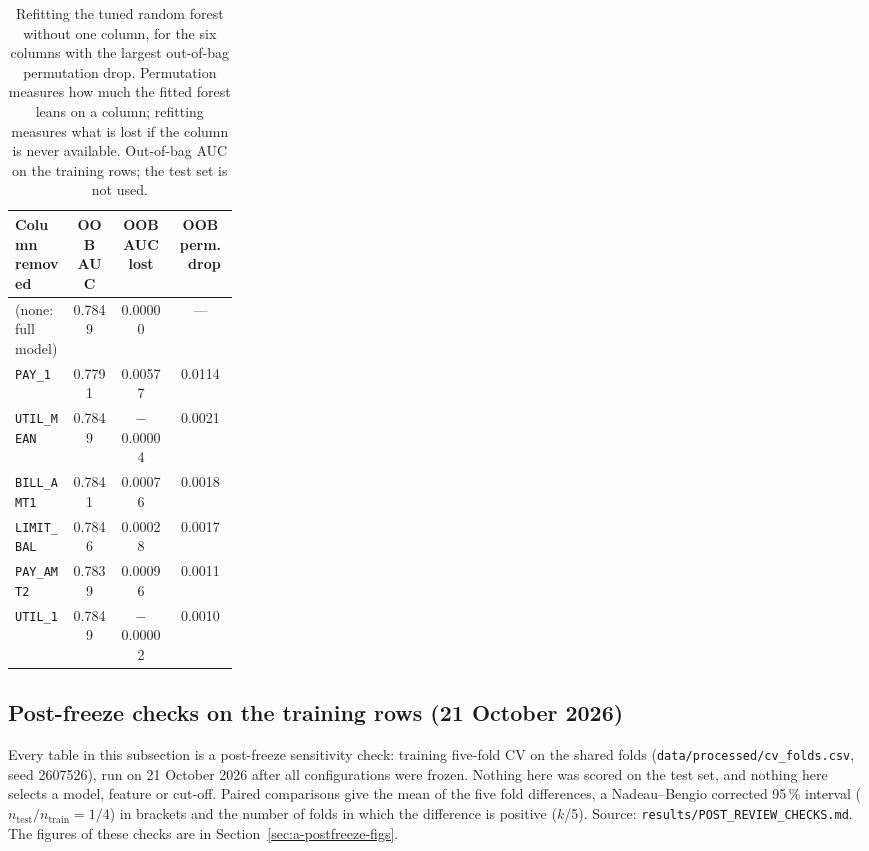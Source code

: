 \begin{table}[!htbp]
  \caption{Refitting the tuned random forest without one column, for the six columns with the largest out-of-bag permutation drop. Permutation measures how much the fitted forest leans on a column; refitting measures what is lost if the column is never available. Out-of-bag AUC on the training rows; the test set is not used.}
  \label{tab:a-refit}
  \centering
  \small
  \begin{tabular}{@{}L{0.26\linewidth}ccc@{}}
    \toprule
    Column removed & OOB AUC & OOB AUC lost & OOB perm.\ drop \\
    \midrule
    (none: full model) & 0.7849 & 0.00000 & --- \\
    \texttt{PAY\_\allowbreak{}1} & 0.7791 & 0.00577 & 0.0114 \\
    \texttt{UTIL\_\allowbreak{}MEAN} & 0.7849 & $-$0.00004 & 0.0021 \\
    \texttt{BILL\_\allowbreak{}AMT1} & 0.7841 & 0.00076 & 0.0018 \\
    \texttt{LIMIT\_\allowbreak{}BAL} & 0.7846 & 0.00028 & 0.0017 \\
    \texttt{PAY\_\allowbreak{}AMT2} & 0.7839 & 0.00096 & 0.0011 \\
    \texttt{UTIL\_\allowbreak{}1} & 0.7849 & $-$0.00002 & 0.0010 \\
    \bottomrule
  \end{tabular}
\end{table}

\clearpage
\subsection{Post-freeze checks on the training rows (21 October 2026)}\label{sec:a-postfreeze}

Every table in this subsection is a post-freeze sensitivity check: training five-fold CV on the shared folds (\texttt{data/processed/cv\_folds.csv}, seed 2607526), run on 21 October 2026 after all configurations were frozen. Nothing here was scored on the test set, and nothing here selects a model, feature or cut-off. Paired comparisons give the mean of the five fold differences, a Nadeau--Bengio corrected 95\,\% interval ($n_{\mathrm{test}}/n_{\mathrm{train}} = 1/4$) in brackets and the number of folds in which the difference is positive ($k$/5). Source: \texttt{results/POST\_REVIEW\_CHECKS.md}. The figures of these checks are in Section~\ref{sec:a-postfreeze-figs}.

